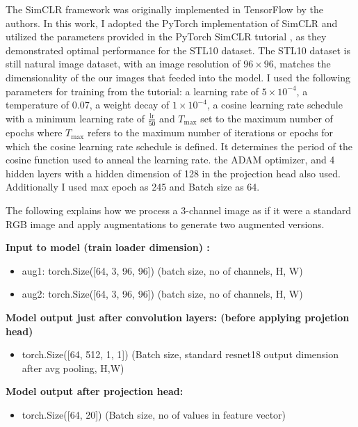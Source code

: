 The SimCLR framework was originally implemented in TensorFlow by the authors. In this work, I adopted the PyTorch implementation of SimCLR and utilized the parameters provided 
in
 the PyTorch SimCLR tutorial \cite{lippe2024uvadlc} , as they demonstrated optimal performance for the STL10 dataset. The STL10 dataset is still natural image dataset,
  with an image resolution of \( 96 \times 96 \),  matches the dimensionality of the our images that feeded into the model. 
 I used the following parameters for training from the tutorial: a learning rate of \( 5 \times 10^{-4} \), a temperature of 0.07, a weight decay of \( 1 \times 10^{-4} \), a cosine learning 
 rate schedule with a minimum learning rate of \( \frac{\text{lr}}{50} \) and \( T_{\text{max}} \) set to the maximum number of epochs where 
 \( T_{\text{max}} \) refers to the maximum number of iterations or epochs for which the cosine learning rate schedule is defined. It determines the period of the cosine function used to anneal the learning rate. the ADAM optimizer, and 4 hidden layers
with a hidden dimension of 128 in the projection head also used. Additionally I used max epoch as 245 and Batch size as 64.

The following explains how we process a 3-channel image as if it were a standard RGB image and apply augmentations to generate two augmented versions.

\textbf{Input to model (train loader dimension) :} 

\begin{itemize}
  \item aug1: torch.Size([64, 3, 96, 96])        (batch size, no of channels, H, W)
  \item aug2: torch.Size([64, 3, 96, 96])        (batch size, no of channels, H, W) \vspace{1em}
\end{itemize} \vspace{1em}
\textbf{Model output just after convolution layers: (before applying projetion head)} 
\begin{itemize}
  \item torch.Size([64, 512, 1, 1]) (Batch size, standard resnet18 output dimension after avg pooling, H,W)   
\end{itemize}

\textbf{Model output after projection head:}
\begin{itemize}
  \item torch.Size([64, 20])  (Batch size, no of values in feature vector)  
\end{itemize}

